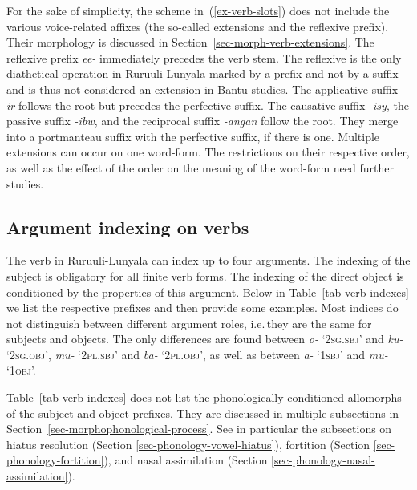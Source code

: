 For the sake of simplicity, the scheme in~(\ref{ex-verb-slots}) does not include the various voice-related affixes (the so-called extensions and the reflexive prefix). 
Their morphology is discussed in Section~\ref{sec-morph-verb-extensions}. 
The reflexive prefix \mbox{\textit{ee-}} immediately precedes the verb stem.  
The reflexive is the only diathetical operation in Ru\-ruu\-li\hyp{}Lu\-nya\-la marked by a prefix and not by a suffix and is thus not considered an extension in Bantu studies. 
The applicative suffix \textit{-ir} follows the root but precedes the perfective suffix. 
The causative suffix \textit{-isy}, the passive suffix \textit{-ibw}, and the reciprocal suffix \textit{-angan} follow the root. 
They merge into a portmanteau suffix with the perfective suffix, if there is one. 
Multiple extensions can occur on one word-form. 
The restrictions on their respective order, as well as the effect of the order on the meaning of the word-form need further studies.

\subsection{Argument indexing on verbs}\label{sec-verb-indexing}

The verb in Ru\-ruu\-li\hyp{}Lu\-nya\-la can index up to four arguments. 
The indexing of the subject 
is obligatory for all finite verb forms. 
The indexing of the direct object is conditioned by the properties of this argument. 
Below in Table~\ref{tab-verb-indexes} we list the respective prefixes and then provide some examples.
Most indices do not distinguish between different argument roles, i.e.\,they are the same for subjects and objects. 
The only differences are found between \textit{o-} ‘2\textsc{sg.sbj}’ and  \textit{ku-} ‘2\textsc{sg.obj}’,  \textit{mu-} ‘2\textsc{pl.sbj}’ and  \textit{ba-} ‘2\textsc{pl.obj}’, as well as between \textit{a-} ‘1\textsc{sbj}’ and  \textit{mu-} ‘1\textsc{obj}’. 

Table~\ref{tab-verb-indexes} does not list the phonologically-conditioned allomorphs of the subject and object prefixes. They are discussed in multiple subsections in Section~\ref{sec-morphophonological-process}. 
See in particular the subsections on hiatus resolution (Section \ref{sec-phonology-vowel-hiatus}), fortition (Section \ref{sec-phonology-fortition}), and nasal assimilation (Section \ref{sec-phonology-nasal-assimilation}).

